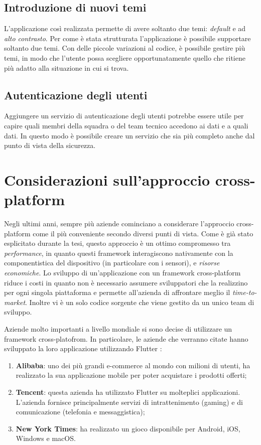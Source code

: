 \subsection{Introduzione di nuovi temi}
L'applicazione così realizzata permette di avere soltanto due temi: \textit{default} e ad \textit{alto contrasto}. Per come è stata strutturata l'applicazione è possibile supportare soltanto due temi. Con delle piccole variazioni al codice, è possibile gestire più temi, in modo che l'utente possa scegliere opportunatamente quello che ritiene più adatto alla situazione in cui si trova.

\subsection{Autenticazione degli utenti}
Aggiungere un servizio di autenticazione degli utenti potrebbe essere utile per capire quali membri della squadra o del team tecnico accedono ai dati e a quali dati. In questo modo è possibile creare un servizio che sia più completo anche dal punto di vista della sicurezza.

\section{Considerazioni sull'approccio cross-platform}
Negli ultimi anni, sempre più aziende cominciano a considerare l'approccio cross-platform come il più conveniente secondo diversi punti di vista. Come è già stato esplicitato durante la tesi, questo approccio è un ottimo compromesso tra \textit{performance}, in quanto questi framework interagiscono nativamente con la componentistica del dispositivo (in particolare con i sensori), e \textit{risorse economiche}. Lo sviluppo di un'applicazione con un framework cross-platform riduce i costi in quanto non è necessario assumere sviluppatori che la realizzino per ogni singola piattaforma e permette all'azienda di affrontare meglio il \textit{time-to-market}. Inoltre vi è un solo codice sorgente che viene gestito da un unico team di sviluppo.

Aziende molto importanti a livello mondiale si sono decise di utilizzare un framework cross-platofrom. In particolare, le aziende che verranno citate hanno sviluppato la loro applicazione utilizzando Flutter \cite{flutter_showcase}:
\begin{enumerate}
	\item \textbf{Alibaba}: uno dei più grandi e-commerce al mondo con milioni di utenti, ha realizzato la sua applicazione mobile per poter acquistare i prodotti offerti;
	\item \textbf{Tencent}: questa azienda ha utilizzato Flutter su molteplici applicazioni. L'azienda fornisce principalmente servizi di intrattenimento (gaming) e di comunicazione (telefonia e messaggistica);
	\item \textbf{New York Times}: ha realizzato un gioco disponibile per Android, iOS, Windows e macOS.
\end{enumerate}

